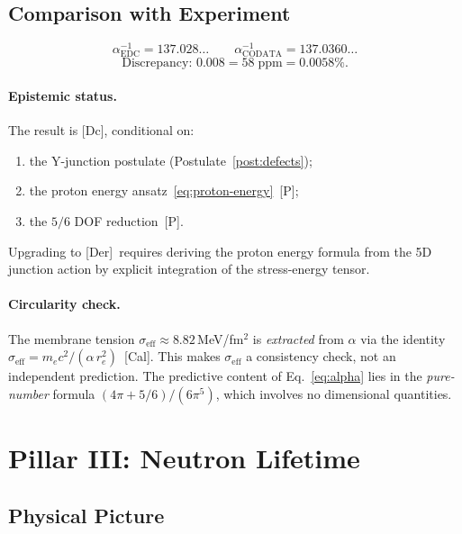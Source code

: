 \documentclass[12pt,a4paper]{article}
\theoremstyle{definition}
\theoremstyle{remark}
\newcommand{\tagDer}{\textsf{[Der]}}
\newcommand{\tagDc}{\textsf{[Dc]}}
\newcommand{\tagP}{\textsf{[P]}}
\newcommand{\tagCal}{\textsf{[Cal]}}
\begin{document}
\subsection{Comparison with Experiment}

\begin{equation}
  \alpha^{-1}_{\mathrm{EDC}} = 137.028\ldots
  \qquad
  \alpha^{-1}_{\mathrm{CODATA}} = 137.0360\ldots
\end{equation}
\[
  \text{Discrepancy: } 0.008 = 58\;\mathrm{ppm} = 0.0058\%.
\]

\paragraph{Epistemic status.}
The result is \tagDc, conditional on:
\begin{enumerate}[nosep]
\item the Y-junction postulate (Postulate~\ref{post:defects});
\item the proton energy ansatz~\eqref{eq:proton-energy}~\tagP;
\item the $5/6$ DOF reduction~\tagP.
\end{enumerate}
Upgrading to \tagDer\ requires deriving the proton energy formula
from the 5D junction action by explicit integration of the
stress-energy tensor.

\paragraph{Circularity check.}
The membrane tension
$\sigma_{\mathrm{eff}} \approx 8.82$\,MeV/fm$^2$ is
\emph{extracted} from $\alpha$ via the identity
$\sigma_{\mathrm{eff}} = m_e c^2/(\alpha\,r_e^2)$~\tagCal.  This
makes $\sigma_{\mathrm{eff}}$ a consistency check, not an
independent prediction.  The predictive content of
Eq.~\eqref{eq:alpha} lies in the \emph{pure-number} formula
$(4\pi + 5/6)/(6\pi^5)$, which involves no dimensional quantities.

\section{Pillar III: Neutron Lifetime}
\label{sec:neutron}

\subsection{Physical Picture}
\end{document}
